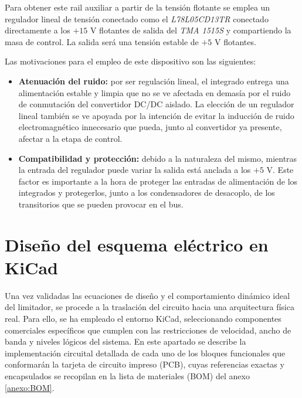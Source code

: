 \documentclass[12pt]{report} %
\begin{document}
Para obtener este rail auxiliar a partir de la tensión flotante se emplea un regulador lineal de tensión conectado como el \textit{L78L05CD13TR} conectado directamente a los $+15\text{ V}$ flotantes de salida del \textit{TMA 1515S} y compartiendo la masa de control. La salida será una tensión estable de $+5\text{ V}$ flotantes.

Las motivaciones para el empleo de este dispositivo son las siguientes:
\begin{itemize}
    \item \textbf{Atenuación del ruido:} por ser regulación lineal, el integrado entrega una alimentación estable y limpia que no se ve afectada en demasía por el ruido de conmutación del convertidor DC/DC aislado. La elección de un regulador lineal también se ve apoyada por la intención de evitar la inducción de ruido electromagnético innecesario que pueda, junto al convertidor ya presente, afectar a la etapa de control. 
    \item \textbf{Compatibilidad y protección:} debido a la naturaleza del mismo, mientras la entrada del regulador puede variar la salida está anclada a los $+5\text{ V}$. Este factor es importante a la hora de proteger las entradas de alimentación de los integrados y protegerlos, junto a los condensadores de desacoplo, de los transitorios que se pueden provocar en el bus. 
\end{itemize}

\section{Diseño del esquema eléctrico en KiCad}

Una vez validadas las ecuaciones de diseño y el comportamiento dinámico ideal del limitador, se procede a la traslación del circuito hacia una arquitectura física real. Para ello, se ha empleado el entorno KiCad, seleccionando componentes comerciales específicos que cumplen con las restricciones de velocidad, ancho de banda y niveles lógicos del sistema. En este apartado se describe la implementación circuital detallada de cada uno de los bloques funcionales que conformarán la tarjeta de circuito impreso (PCB), cuyas referencias exactas y encapsulados se recopilan en la lista de materiales (BOM) del anexo \ref{anexo:BOM}.
\end{document}

